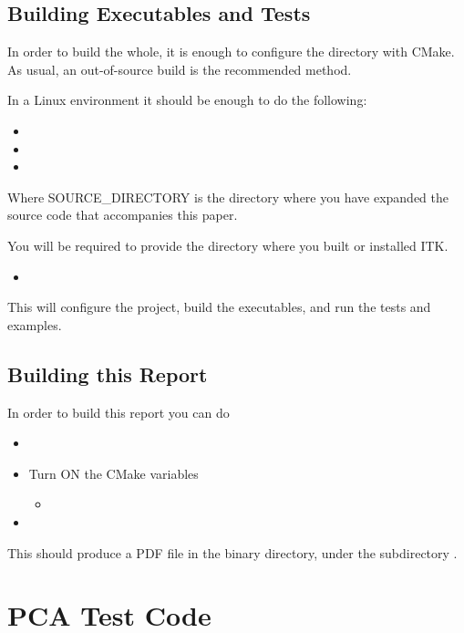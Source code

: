 \documentclass{InsightArticle}
\begin{document}
\subsection{Building Executables and Tests}

In order to build the whole, it is enough to configure the directory with
CMake. As usual, an out-of-source build is the recommended method.

In a Linux environment it should be enough to do the following:

\begin{itemize}
\item {}
\item {}
\item {}
\end{itemize}

Where SOURCE\_DIRECTORY is the directory where you have expanded the source
code that accompanies this paper.

You will be required to provide the directory where you built or installed ITK.

\begin{itemize}
\item {}
\end{itemize}

This will configure the project, build the executables, and run the tests and
examples. 


\subsection{Building this Report}

In order to build this report you can do

\begin{itemize}
\item {}
\item Turn ON the CMake variables
\begin{itemize}
\item {}
\end{itemize}
\item {}
\end{itemize}

This should produce a PDF file in the binary directory, under the subdirectory
.

\section{PCA Test Code}
\end{document}
